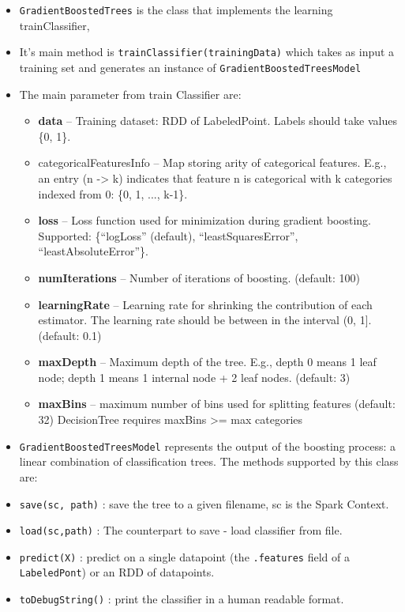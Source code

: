 \documentclass[11pt]{article}
\providecommand{\tightlist}{%
      \setlength{\itemsep}{0pt}\setlength{\parskip}{0pt}}
\begin{document}
\begin{itemize}
\tightlist
\item
  \texttt{GradientBoostedTrees} is the class that implements the
  learning trainClassifier,
\item
  It's main method is \texttt{trainClassifier(trainingData)} which takes
  as input a training set and generates an instance of
  \texttt{GradientBoostedTreesModel}
\item
  The main parameter from train Classifier are:

  \begin{itemize}
  \tightlist
  \item
    \textbf{data} -- Training dataset: RDD of LabeledPoint. Labels
    should take values \{0, 1\}.
  \item
    categoricalFeaturesInfo -- Map storing arity of categorical
    features. E.g., an entry (n -\textgreater{} k) indicates that
    feature n is categorical with k categories indexed from 0: \{0, 1,
    ..., k-1\}.
  \item
    \textbf{loss} -- Loss function used for minimization during gradient
    boosting. Supported: \{``logLoss'' (default), ``leastSquaresError'',
    ``leastAbsoluteError''\}.
  \item
    \textbf{numIterations} -- Number of iterations of boosting.
    (default: 100)
  \item
    \textbf{learningRate} -- Learning rate for shrinking the
    contribution of each estimator. The learning rate should be between
    in the interval (0, 1{]}. (default: 0.1)
  \item
    \textbf{maxDepth} -- Maximum depth of the tree. E.g., depth 0 means
    1 leaf node; depth 1 means 1 internal node + 2 leaf nodes. (default:
    3)
  \item
    \textbf{maxBins} -- maximum number of bins used for splitting
    features (default: 32) DecisionTree requires maxBins \textgreater{}=
    max categories
  \end{itemize}
\item
  \texttt{GradientBoostedTreesModel} represents the output of the
  boosting process: a linear combination of classification trees. The
  methods supported by this class are:
\item
  \texttt{save(sc,\ path)} : save the tree to a given filename, sc is
  the Spark Context.
\item
  \texttt{load(sc,path)} : The counterpart to save - load classifier
  from file.
\item
  \texttt{predict(X)} : predict on a single datapoint (the
  \texttt{.features} field of a \texttt{LabeledPont}) or an RDD of
  datapoints.
\item
  \texttt{toDebugString()} : print the classifier in a human readable
  format.
\end{itemize}
\end{document}
